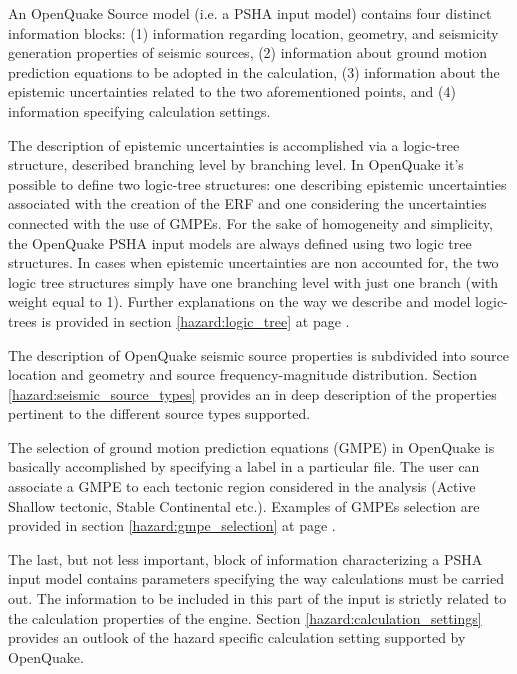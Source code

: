 An OpenQuake Source model (i.e. a PSHA input model) contains four distinct information blocks: (1) information 
regarding location, geometry, and seismicity generation properties of seismic
sources, (2) information about ground motion prediction equations to be 
adopted in the calculation, (3) information about the epistemic uncertainties 
related to the two aforementioned points, and (4) information specifying 
calculation settings.

The description of epistemic uncertainties is accomplished via a logic-tree 
structure, described branching level by branching level. In OpenQuake it's 
possible to define two logic-tree structures: one describing epistemic 
uncertainties associated with the creation of the ERF and one considering the
uncertainties connected with the use of GMPEs. For the sake of homogeneity 
and simplicity, the OpenQuake PSHA input models are always defined using two 
logic tree structures. In cases when epistemic uncertainties are non accounted
for, the two logic tree structures simply have one branching level with just one 
branch (with weight equal to 1).
Further explanations on the way we describe and model logic-trees is provided 
in section \ref{hazard:logic_tree} at page \pageref{hazard:logic_tree}. 

The description of OpenQuake seismic source properties is subdivided into 
source location and geometry and source frequency-magnitude distribution. 
Section \ref{hazard:seismic_source_types} provides an in deep description of 
the properties pertinent to the different source types supported. 

The selection of ground motion prediction equations (GMPE) in OpenQuake 
is basically accomplished by specifying a label in a particular file.  
The user can associate a GMPE to each tectonic region considered in the 
analysis (Active Shallow tectonic, Stable Continental etc.). Examples of 
GMPEs selection are provided in section \ref{hazard:gmpe_selection} at page 
\pageref{hazard:gmpe_selection}.

The last, but not less important, block of information characterizing a PSHA 
input model contains parameters specifying the way calculations must be 
carried out. The information to be included in this part of the input is 
strictly related to the calculation properties of the engine. Section 
\ref{hazard:calculation_settings} provides an outlook of the hazard specific 
calculation setting supported by OpenQuake. 
%
